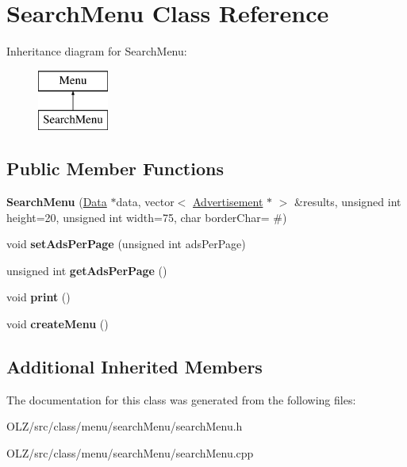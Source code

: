 \hypertarget{class_search_menu}{}\section{Search\+Menu Class Reference}
\label{class_search_menu}
Inheritance diagram for Search\+Menu\+:\begin{figure}[H]
\begin{center}
\leavevmode
\includegraphics[height=2.000000cm]{class_search_menu}
\end{center}
\end{figure}
\subsection*{Public Member Functions}
\begin{DoxyCompactItemize}
\item 
\hypertarget{class_search_menu_ae0e28277ac4fea08c1f09b9fa502919f}{}{\bfseries Search\+Menu} (\hyperlink{class_data}{Data} $\ast$data, vector$<$ \hyperlink{class_advertisement}{Advertisement} $\ast$ $>$ \&results, unsigned int height=20, unsigned int width=75, char border\+Char= \textquotesingle{}\#\textquotesingle{})\label{class_search_menu_ae0e28277ac4fea08c1f09b9fa502919f}

\item 
\hypertarget{class_search_menu_a506fce847fc8201ccc63d3fbc2ede3b8}{}void {\bfseries set\+Ads\+Per\+Page} (unsigned int ads\+Per\+Page)\label{class_search_menu_a506fce847fc8201ccc63d3fbc2ede3b8}

\item 
\hypertarget{class_search_menu_a39156ea5dcb600c0bf12eadc503f7268}{}unsigned int {\bfseries get\+Ads\+Per\+Page} ()\label{class_search_menu_a39156ea5dcb600c0bf12eadc503f7268}

\item 
\hypertarget{class_search_menu_a4fbc2741c5d72f4fe7473e5de5a5d14e}{}void {\bfseries print} ()\label{class_search_menu_a4fbc2741c5d72f4fe7473e5de5a5d14e}

\item 
\hypertarget{class_search_menu_a97f499b313e88142590aa51c2ef82f3d}{}void {\bfseries create\+Menu} ()\label{class_search_menu_a97f499b313e88142590aa51c2ef82f3d}

\end{DoxyCompactItemize}
\subsection*{Additional Inherited Members}


The documentation for this class was generated from the following files\+:\begin{DoxyCompactItemize}
\item 
O\+L\+Z/src/class/menu/search\+Menu/search\+Menu.\+h\item 
O\+L\+Z/src/class/menu/search\+Menu/search\+Menu.\+cpp\end{DoxyCompactItemize}
